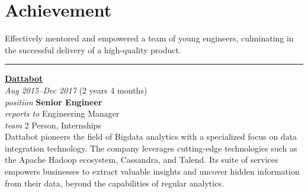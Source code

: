 \documentclass[12pt]{res}
\begin{document}
\begin{resume}
\begin{minipage}[t]{0.55\linewidth}
\begin{multicols}{2}
		\section{}
	\end{multicols}
	\vspace{1pt}
\end{minipage}
\hfill
\begin{minipage}[t]{0.42\linewidth}
	\vspace{18pt}
	\section{Achievement}
	\begin{flushleft}
        \footnotesize{\vspace{2.6pt}
Effectively mentored and empowered a team of young engineers, culminating in the successful delivery of a high-quality product.}
	\end{flushleft}
\end{minipage}

\vspace{10pt}
\rule{1.0\textwidth}{0.1pt}

\begin{multicols}{2}
	{\large {\bf \href{https://dattabot.io}{Dattabot}}} \\
	{\footnotesize{\sl Aug 2015--Dec 2017} \hfill (2 years 4 months)}\\
	{\footnotesize{\sl position} \hfill \bf{Senior Engineer}}\\
	{\footnotesize{\sl reports to} \hfill Engineering Manager}\\
	{\footnotesize{\sl team} \hfill 2 Person, Internships}\\

	\columnbreak
	{\footnotesize{Dattabot pioneers the field of Bigdata analytics with a specialized focus on data integration technology. The company leverages cutting-edge technologies such as the Apache Hadoop ecosystem, Cassandra, and Talend. Its suite of services empowers businesses to extract valuable insights and uncover hidden information from their data, beyond the capabilities of regular analytics.}}\\
\end{multicols}
\vspace{-20pt}


\end{resume}
\end{document}

